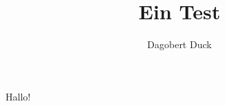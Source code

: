 \documentclass{fablab-aushang}
\title{Ein Test}
\author{Dagobert Duck}
\begin{document}
\maketitle
 

Hallo! \blindtext[20]
\end{document}

